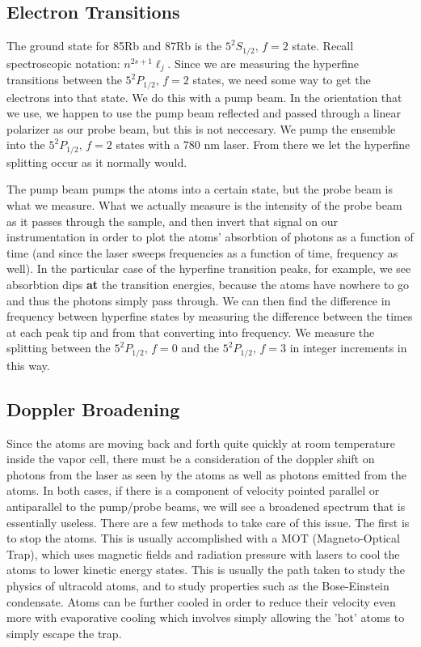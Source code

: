 \documentclass{article}
\newcommand{\twohalff}[2]{$5^2 #1_{1/2},\, f = #2$}
\newcommand{\twohalf}[1]{$5^2 #1_{1/2},\, f = 2$}
\begin{document}
  \hspace{.25cm}

  \subsection{Electron Transitions}
  The ground state for 85Rb and 87Rb is the \twohalf{S} state.  Recall spectroscopic notation: $n^{2s+1}\ell_{j}$.  Since we are measuring the hyperfine transitions between the \twohalf{P} states, we need some way to get the electrons into that state.  We do this with a pump beam.  In the orientation that we use, we happen to use the pump beam reflected and passed through a linear polarizer as our probe beam, but this is not neccesary.  We pump the ensemble into the \twohalf{P} states with a 780 nm laser.  From there we let the hyperfine splitting occur as it normally would.

  \hspace{.25cm}

  The pump beam pumps the atoms into a certain state, but the probe beam is what we measure.  What we actually measure is the intensity of the probe beam as it passes through the sample, and then invert that signal on our instrumentation in order to plot the atoms' absorbtion of photons as a function of time (and since the laser sweeps frequencies as a function of time, frequency as well).  In the particular case of the hyperfine transition peaks, for example, we see absorbtion dips \textbf{at} the transition energies, because the atoms have nowhere to go and thus the photons simply pass through.  We can then find the difference in frequency between hyperfine states by measuring the difference between the times at each peak tip and from that converting into frequency.  We measure the splitting between the \twohalff{P}{0} and the \twohalff{P}{3} in integer increments in this way.

  \subsection{Doppler Broadening}
  Since the atoms are moving back and forth quite quickly at room temperature inside the vapor cell, there must be a consideration of the doppler shift on photons from the laser as seen by the atoms as well as photons emitted from the atoms.  In both cases, if there is a component of velocity pointed parallel or antiparallel to the pump/probe beams, we will see a broadened spectrum that is essentially useless.  There are a few methods to take care of this issue.  The first is to stop the atoms.  This is usually accomplished with a MOT (Magneto-Optical Trap), which uses magnetic fields and radiation pressure with lasers to cool the atoms to lower kinetic energy states.  This is usually the path taken to study the physics of ultracold atoms, and to study properties such as the Bose-Einstein condensate.  Atoms can be further cooled in order to reduce their velocity even more with evaporative cooling which involves simply allowing the 'hot' atoms to simply escape the trap.
\end{document}
